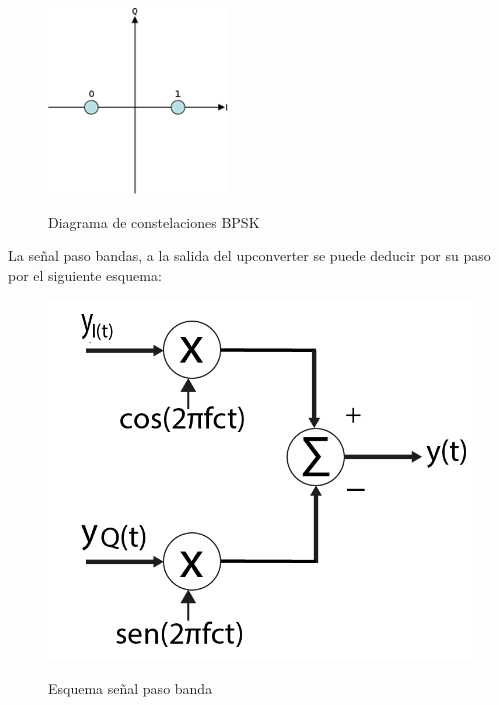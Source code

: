\begin{figure}[h!]
	\captionsetup{justification = raggedright, singlelinecheck = false}
	\caption{Diagrama de constelaciones BPSK}
	\centering
	\includegraphics[scale=1]{Imagenes/Constelaciones.png}
	\label{fig:Constelaciones}
\end{figure}

La señal paso bandas, a la salida del upconverter se puede deducir por su paso por el siguiente esquema:

\vspace{300px}
\begin{figure}[h!]
	\captionsetup{justification = raggedright, singlelinecheck = false}
	\caption{Esquema señal paso banda}
	\centering
	\includegraphics[scale=0.3]{Imagenes/Y.png}
	\label{fig:Y}
\end{figure}		

